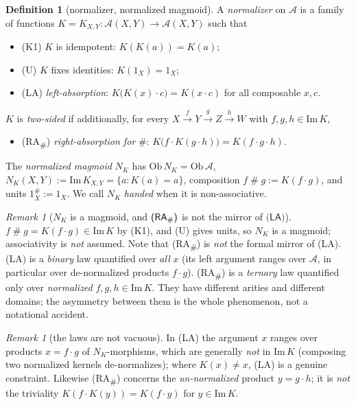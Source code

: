 \documentclass[11pt]{amsart}
\theoremstyle{plain}
\theoremstyle{definition}
\newtheorem{definition}[theorem]{Definition}
\theoremstyle{remark}
\newtheorem{remark}[theorem]{Remark}
\newcommand{\Img}{\mathrm{Im}\,}
\newcommand{\sh}{\mathbin{\#}}
\newcommand{\LA}{\textsf{(LA)}}
\newcommand{\RA}{\textsf{(RA}\textsubscript{\#}\textsf{)}}
\begin{document}
\begin{definition}[normalizer, normalized magmoid]
\label{def:normalizer}
A \emph{normalizer} on $\mathcal{A}$ is a family of functions
$K=K_{X,Y}\colon\mathcal{A}(X,Y)\to\mathcal{A}(X,Y)$ such that
\begin{itemize}
  \item \textsf{(K1)} $K$ is idempotent: $K(K(a))=K(a)$;
  \item \textsf{(U)} $K$ fixes identities: $K(1_{X})=1_{X}$;
  \item \LA{} \emph{left-absorption}: $K\big(K(x)\cdot c\big)=K(x\cdot c)$ for all composable $x,c$.
\end{itemize}
$K$ is \emph{two-sided} if additionally, for every
$X\xrightarrow{f}Y\xrightarrow{g}Z\xrightarrow{h}W$ with $f,g,h\in\Img K$,
\begin{itemize}
  \item \RA{} \emph{right-absorption for} $\sh$: $K\big(f\cdot K(g\cdot h)\big)=K(f\cdot g\cdot h)$.
\end{itemize}
The \emph{normalized magmoid} $N_{K}$ has $\mathrm{Ob}\,N_{K}=\mathrm{Ob}\,\mathcal{A}$,
$N_{K}(X,Y):=\Img K_{X,Y}=\{a:K(a)=a\}$, composition $f\sh g:=K(f\cdot g)$, and units
$1^{\sh}_{X}:=1_{X}$. We call $N_K$ \emph{handed} when it is non-associative.
\end{definition}

\begin{remark}[$N_K$ is a magmoid, and $\RA$ is not the mirror of $\LA$]
\label{rem:welldef}
$f\sh g=K(f\cdot g)\in\Img K$ by \textsf{(K1)}, and \textsf{(U)} gives units, so $N_{K}$ is a
magmoid; associativity is \emph{not} assumed. Note that \RA{} is \emph{not} the formal mirror of
\LA{}. \LA{} is a \emph{binary} law quantified over \emph{all} $x$ (its left argument ranges over
$\mathcal{A}$, in particular over de-normalized products $f\cdot g$). \RA{} is a \emph{ternary} law
quantified only over \emph{normalized} $f,g,h\in\Img K$. They have different arities and different
domains; the asymmetry between them is the whole phenomenon, not a notational accident.
\end{remark}

\begin{remark}[the laws are not vacuous]
\label{rem:nonvac}
In \LA{} the argument $x$ ranges over products $x=f\cdot g$ of $N_{K}$-morphisms, which are generally
\emph{not} in $\Img K$ (composing two normalized kernels de-normalizes); where $K(x)\ne x$, \LA{} is
a genuine constraint. Likewise \RA{} concerns the \emph{un-normalized} product $y=g\cdot h$; it is
\emph{not} the triviality $K(f\cdot K(y))=K(f\cdot y)$ for $y\in\Img K$.
\end{remark}
\end{document}
